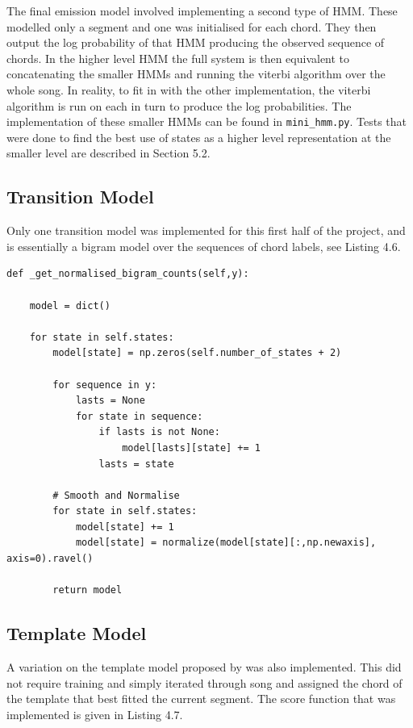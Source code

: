 \documentclass[bsc,singlespacing,parskip,deptreport,twoside,frontabs]{infthesis}
\begin{document}
The final emission model involved implementing a second type of HMM. These modelled only a segment and one was initialised for each chord. They then output the log probability of that HMM producing the observed sequence of chords. In the higher level HMM the full system is then equivalent to concatenating the smaller HMMs and running the viterbi algorithm over the whole song. In reality, to fit in with the other implementation, the viterbi algorithm is run on each in turn to produce the log probabilities. The implementation of these smaller HMMs can be found in {\tt mini\_hmm.py}. Tests that were done to find the best use of states as a higher level representation at the smaller level are described in Section 5.2.

\subsection{Transition Model}

Only one transition model was implemented for this first half of the project, and is essentially a bigram model over the sequences of chord labels, see Listing 4.6.

\begin{lstlisting}[frame=single,caption='Transition Model']
def _get_normalised_bigram_counts(self,y):

	model = dict()

	for state in self.states:
    	model[state] = np.zeros(self.number_of_states + 2)

		for sequence in y:
			lasts = None
			for state in sequence:
				if lasts is not None:
					model[lasts][state] += 1
				lasts = state

		# Smooth and Normalise
		for state in self.states:
			model[state] += 1
			model[state] = normalize(model[state][:,np.newaxis], axis=0).ravel()

		return model
\end{lstlisting}

\subsection{Template Model}

A variation on the template model proposed by \cite{pardo2002algorithms} was also implemented. This did not require training and simply iterated through song and assigned the chord of the template that best fitted the current segment. The score function that was implemented is given in Listing 4.7.
\end{document}

